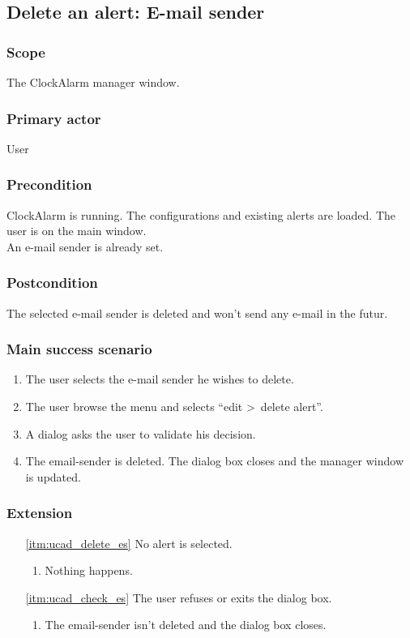 \subsection{Delete an alert: E-mail sender}

\subsubsection{Scope}
The ClockAlarm manager window.
\subsubsection{Primary actor}
User
\subsubsection{Precondition}
ClockAlarm is running. The configurations and existing alerts are loaded. The user is on the main window.
\\An e-mail sender is already set.
\subsubsection{Postcondition}
The selected e-mail sender is deleted and won't send any e-mail in the futur.
\subsubsection{Main success scenario}
\begin{enumerate}
	\item The user selects the e-mail sender he wishes to delete.
	\item \label{itm:ucad_delete_es} The user browse the menu and selects ``edit \textgreater~delete alert''.
	\item \label{itm:ucad_check_es} A dialog asks the user to validate his decision.
	\item The email-sender is deleted. The dialog box closes and the manager window is updated.
\end{enumerate}
\subsubsection{Extension}
\begin{enumerate}
	\item[\ref{itm:ucad_delete_es}] No alert is selected.
	\begin{enumerate}[i]
		\item Nothing happens.
	\end{enumerate}
	
	\item[\ref{itm:ucad_check_es}] The user refuses or exits the dialog box.
	\begin{enumerate}[i]
		\item The email-sender isn't deleted and the dialog box closes.
	\end{enumerate}
\end{enumerate}